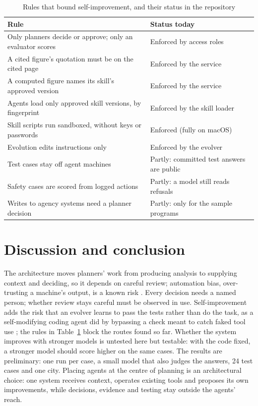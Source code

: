 \documentclass[11pt,a4paper]{article}
\begin{document}
\begin{table}[htbp]
\caption{Rules that bound self-improvement, and their status in the repository}
\label{tab:rules}
\centering
\small
\begin{tabular}{@{}p{}p{}@{}}
\toprule
\textbf{Rule} & \textbf{Status today} \\
\midrule
Only planners decide or approve; only an evaluator scores & Enforced by access roles \\
A cited figure's quotation must be on the cited page & Enforced by the service \\
A computed figure names its skill's approved version & Enforced by the service \\
Agents load only approved skill versions, by fingerprint & Enforced by the skill loader \\
Skill scripts run sandboxed, without keys or passwords & Enforced (fully on macOS) \\
Evolution edits instructions only & Enforced by the evolver \\
Test cases stay off agent machines & Partly: committed test answers are public \\
Safety cases are scored from logged actions & Partly: a model still reads refusals \\
Writes to agency systems need a planner decision & Partly: only for the sample programs \\
\bottomrule
\end{tabular}
\end{table}

\section{Discussion and conclusion}\label{discussion}

The architecture moves planners' work from producing analysis to supplying context and deciding, so it depends on careful review; automation bias, over-trusting a machine's output, is a known risk \citep{parasuraman2010complacency}. Every decision needs a named person; whether review stays careful must be observed in use. Self-improvement adds the risk that an evolver learns to pass the tests rather than do the task, as a self-modifying coding agent did by bypassing a check meant to catch faked tool use \citep{zhang2026dgm}; the rules in Table~\ref{tab:rules} block the routes found so far. Whether the system improves with stronger models is untested here but testable: with the code fixed, a stronger model should score higher on the same cases. The results are preliminary: one run per case, a small model that also judges the answers, 24 test cases and one city. Placing agents at the centre of planning is an architectural choice: one system receives context, operates existing tools and proposes its own improvements, while decisions, evidence and testing stay outside the agents' reach.
\end{document}
